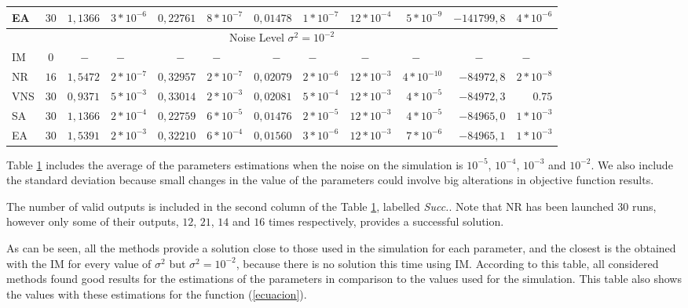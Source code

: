 \documentclass{sig-alternate}
\begin{document}
{\begin{table}
\begin{center}
{\begin{tabular}{lc|rrrrrrrrrr}
EA 		&$30$	&$1,1366$	&$3*10^{-6}$	&$0,22761$	&$8*10^{-7}$	&$0,01478$	&$1*10^{-7}$ 	&$12*10^{-4}$&$5*10^{-9}$	& $-141799,8$&$4*10^{-6}$\\
\hline
\multicolumn{12}{c}{Noise Level $\sigma^2=10^{-2}$} \\
\hline
IM 		&$0$ 	&$-\quad$&$ -\qquad$    		&$-\quad$&$-\qquad$    			&$-\quad$&$ -\qquad$    			&$-\qquad$&$-\qquad$				 &$-\qquad$			&$-\qquad$		\\
NR 	&$16$	&$1,5472$&$2*10^{-7}$	&$0,32957$&$2*10^{-7}$	&$0,02079$&$2*10^{-6}$ 	&$12*10^{-3}$&$4*10^{-10}$	&$-84972,8$		&$2*10^{-8}$\\
VNS 	&$30$	&$0,9371$&$5*10^{-3}$	&$0,33014$&$2*10^{-3}$	&$0,02081$&$5*10^{-4}$   &$12*10^{-3}$&$4*10^{-5}$ 	&$-84972,3$		&$0.75$		\\
SA 		&$30$	&$1,1366$&$2*10^{-4}$	&$0,22759$&$6*10^{-5}$	&$0,01476$&$2*10^{-5}$ 	&$12*10^{-3}$&$4*10^{-5}$	&$-84965,0$		&$1*10^{-3}$ \\
EA 		&$30$	&$1,5391$&$2*10^{-3}$	&$0,32210$&$6*10^{-4}$	&$0,01560$&$3*10^{-6}$ 	&$12*10^{-3}$&$7*10^{-6}$	&$-84965,1$		&$1*10^{-3}$ \\
\hline
\end{tabular}}
\label{tabla:parametros}
\end{center}
\end{table}
}
\normalsize


Table \ref{tabla:parametros} includes the average of the parameters estimations when the noise on the simulation is $10^{-5}$, $10^{-4}$, $10^{-3}$ and $10^{-2}$. We also include the standard deviation because  small changes in the value of the parameters could involve big alterations in objective function results.

The number of valid outputs is included in the second column of the Table \ref{tabla:parametros}, labelled \emph{Succ.}. Note that NR has been launched $30$ runs, however only some of their outputs, $12$, $21$, $14$ and $16$ times respectively, provides a successful solution.

As can be seen, all the methods provide a solution close to those used in the simulation for each parameter, and the closest is the obtained with the IM for every value of $\sigma^2$ but $\sigma^2 =10^{-2}$, because there is no solution this time using IM. According to this table, all considered methods found good results for the estimations of the parameters in comparison to the values used for the simulation. This table also shows the values with these estimations for the function (\ref{ecuacion}).
\end{document}
